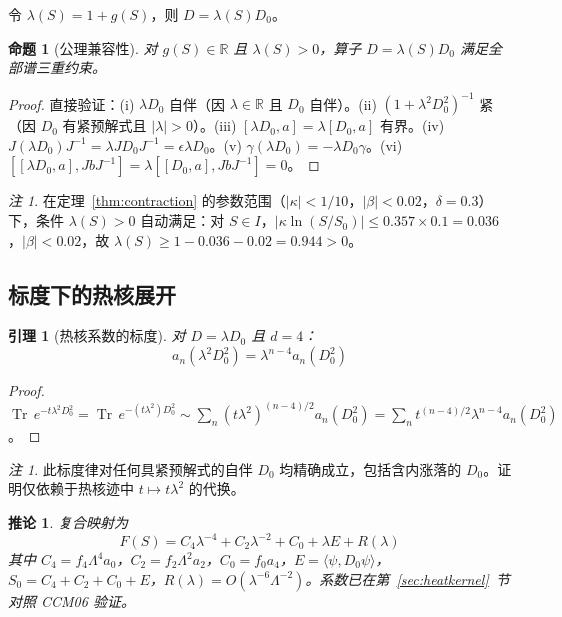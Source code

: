 \documentclass[11pt,a4paper]{ctexart}
\newtheorem{lemma}[theorem]{引理}
\newtheorem{proposition}[theorem]{命题}
\newtheorem{corollary}[theorem]{推论}
\theoremstyle{remark}
\newtheorem{remark}[theorem]{注}
\providecommand{\Tr}{\operatorname{Tr}}
\begin{document}
令 $\lambda(S) = 1 + g(S)$，则 $D = \lambda(S) D_0$。

\begin{proposition}[公理兼容性]
\label{prop:axiom}
对 $g(S) \in \mathbb{R}$ 且 $\lambda(S) > 0$，算子 $D = \lambda(S) D_0$ 满足全部谱三重约束。
\end{proposition}

\begin{proof}
直接验证：(i) $\lambda D_0$ 自伴（因 $\lambda \in \mathbb{R}$ 且 $D_0$ 自伴）。(ii) $(1 + \lambda^2 D_0^2)^{-1}$ 紧（因 $D_0$ 有紧预解式且 $|\lambda| > 0$）。(iii) $[\lambda D_0, a] = \lambda [D_0, a]$ 有界。(iv) $J(\lambda D_0)J^{-1} = \lambda J D_0 J^{-1} = \epsilon \lambda D_0$。(v) $\gamma(\lambda D_0) = -\lambda D_0 \gamma$。(vi) $[[\lambda D_0, a], JbJ^{-1}] = \lambda[[D_0, a], JbJ^{-1}] = 0$。
\end{proof}

\begin{remark}
在定理~\ref{thm:contraction} 的参数范围（$|\kappa| < 1/10$，$|\beta| < 0.02$，$\delta = 0.3$）下，条件 $\lambda(S) > 0$ 自动满足：对 $S \in I$，$|\kappa \ln(S/S_0)| \leq 0.357 \times 0.1 = 0.036$，$|\beta| < 0.02$，故 $\lambda(S) \geq 1 - 0.036 - 0.02 = 0.944 > 0$。
\end{remark}

\subsection{标度下的热核展开}

\begin{lemma}[热核系数的标度]
对 $D = \lambda D_0$ 且 $d=4$：
\[
  a_n(\lambda^2 D_0^2) = \lambda^{n-4} a_n(D_0^2)
\]
\end{lemma}

\begin{proof}
$\Tr\, e^{-t\lambda^2 D_0^2} = \Tr\, e^{-(t\lambda^2) D_0^2} \sim \sum_n (t\lambda^2)^{(n-4)/2} a_n(D_0^2) = \sum_n t^{(n-4)/2} \lambda^{n-4} a_n(D_0^2)$。
\end{proof}

\begin{remark}
此标度律对任何具紧预解式的自伴 $D_0$ 均精确成立，包括含内涨落的 $D_0$。证明仅依赖于热核迹中 $t \mapsto t\lambda^2$ 的代换。
\end{remark}

\begin{corollary}
\label{cor:F}
复合映射为
\[
  F(S) = C_4 \lambda^{-4} + C_2 \lambda^{-2} + C_0 + \lambda E + R(\lambda)
\]
其中 $C_4 = f_4\Lambda^4 a_0$，$C_2 = f_2\Lambda^2 a_2$，$C_0 = f_0 a_4$，$E = \langle\psi, D_0\psi\rangle$，$S_0 = C_4 + C_2 + C_0 + E$，$R(\lambda) = O(\lambda^{-6}\Lambda^{-2})$。系数已在第~\ref{sec:heatkernel}~节对照 CCM06 验证。
\end{corollary}
\end{document}
